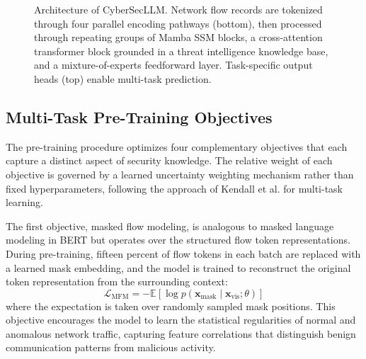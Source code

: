 \documentclass[journal]{IEEEtran}
\newcommand{\modelname}{CyberSecLLM}
\newcommand{\EE}{\mathbb{E}}
\begin{document}
\begin{figure}[!t]
{
}%
\caption{Architecture of \modelname{}. Network flow records are tokenized through four parallel encoding pathways (bottom), then processed through repeating groups of Mamba SSM blocks, a cross-attention transformer block grounded in a threat intelligence knowledge base, and a mixture-of-experts feedforward layer. Task-specific output heads (top) enable multi-task prediction.}
\label{fig:architecture}
\end{figure}

\subsection{Multi-Task Pre-Training Objectives}
\label{subsec:pretraining}

The pre-training procedure optimizes four complementary objectives that each capture a distinct aspect of security knowledge. The relative weight of each objective is governed by a learned uncertainty weighting mechanism rather than fixed hyperparameters, following the approach of Kendall et al. for multi-task learning.

The first objective, masked flow modeling, is analogous to masked language modeling in BERT but operates over the structured flow token representations. During pre-training, fifteen percent of flow tokens in each batch are replaced with a learned mask embedding, and the model is trained to reconstruct the original token representation from the surrounding context:
\begin{equation}
\mathcal{L}_{\text{MFM}} = -\EE\!\left[\log p(\mathbf{x}_{\text{mask}} \mid \mathbf{x}_{\text{vis}}; \theta)\right]
\label{eq:mfm_loss}
\end{equation}
where the expectation is taken over randomly sampled mask positions. This objective encourages the model to learn the statistical regularities of normal and anomalous network traffic, capturing feature correlations that distinguish benign communication patterns from malicious activity.
\end{document}
